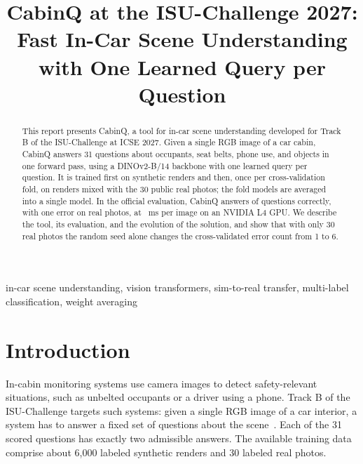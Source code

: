 \documentclass[10pt,conference]{IEEEtran}
\newcommand{\tool}{CabinQ}%
\begin{document}
\title{\tool{} at the ISU-Challenge 2027: Fast In-Car Scene Understanding with One Learned Query per Question}

\author{
}

\maketitle

\begin{abstract}
This report presents \tool{}, a tool for in-car scene understanding developed for Track B of the ISU-Challenge at ICSE 2027. Given a single RGB image of a car cabin, \tool{} answers 31 questions about occupants, seat belts, phone use, and objects in one forward pass, using a DINOv2-B/14 backbone with one learned query per question. It is trained first on synthetic renders and then, once per cross-validation fold, on renders mixed with the 30 public real photos; the fold models are averaged into a single model. In the official evaluation, \tool{} answers \vTwoCorrect{} of \nAll{} questions correctly, with one error on real photos, at \vTwoLat{}~ms per image on an NVIDIA L4 GPU. We describe the tool, its evaluation, and the evolution of the solution, and show that with only 30 real photos the random seed alone changes the cross-validated error count from 1 to 6.
\end{abstract}

\begin{IEEEkeywords}
in-car scene understanding, vision transformers, sim-to-real transfer, multi-label classification, weight averaging
\end{IEEEkeywords}

\section{Introduction}
In-cabin monitoring systems use camera images to detect safety-relevant situations, such as unbelted occupants or a driver using a phone. Track B of the ISU-Challenge targets such systems: given a single RGB image of a car interior, a system has to answer a fixed set of questions about the scene~\cite{sorokin2026isutest}. Each of the 31 scored questions has exactly two admissible answers. The available training data comprise about 6{,}000 labeled synthetic renders and 30 labeled real photos.
\end{document}

